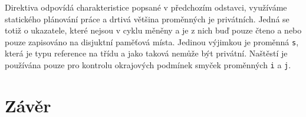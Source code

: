 \documentclass[10pt,a4paper]{article}
\begin{document}
Direktiva odpovídá charakteristice popsané v předchozím odstavci, využíváme
statického plánování práce a drtivá většina proměnných je privátních. Jedná
se totiž o ukazatele, které nejsou v cyklu měněny a je z nich buď pouze čteno
a nebo pouze zapisováno na disjuktní paměťová místa. Jedinou výjimkou je
proměnná \texttt{s}, která je typu reference na třídu a jako taková nemůže
být privátní. Naštěstí je používána pouze pro kontrolu okrajových podmínek
smyček proměnných \texttt{i} a \texttt{j}.

\section{Závěr}
\end{document}
